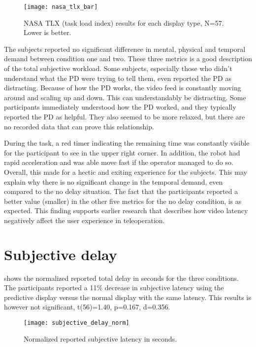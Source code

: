 \begin{figure}[h!]
    \centering
    \texttt{[image: nasa\_tlx\_bar]}
    \caption{NASA TLX (task load index) results for each display type, N=57. Lower is better.}
    \label{tlx}
\end{figure}



The subjects reported no significant difference in mental, physical and temporal demand between condition one and two. These three metrics is a good description of the total subjective workload. Some subjects, especially those who didn't understand what the PD were trying to tell them, even reported the PD as distracting. Because of how the PD works, the video feed is constantly moving around and scaling up and down. This can understandably be distracting. Some participants immediately understood how the PD worked, and they typically reported the PD as helpful. They also seemed to be more relaxed, but there are no recorded data that can prove this relationship.

During the task, a red timer indicating the remaining time was constantly visible for the participant to see in the upper right corner. In addition, the robot had rapid acceleration and was able move fast if the operator managed to do so. Overall, this made for a hectic and exiting experience for the subjects. This may explain why there is no significant change in the temporal demand, even compared to the no delay situation. The fact that the participants reported a better value (smaller) in the other five metrics for the no delay condition, is as expected. This finding supports earlier research that describes how video latency negatively affect the user experience in teleoperation.


\section{Subjective delay}

 shows the normalized reported total delay in seconds for the three conditions. The participants reported a 11\% decrease in subjective latency using the predictive display versus the normal display with the same latency. This results is however not significant, t(56)=1.40, p=0.167, d=0.356.

\begin{figure}[h!]
    \centering
    \texttt{[image: subjective\_delay\_norm]}
    \caption{Normalized reported subjective latency in seconds.}
    \label{subjective_delay_norm}
\end{figure}

